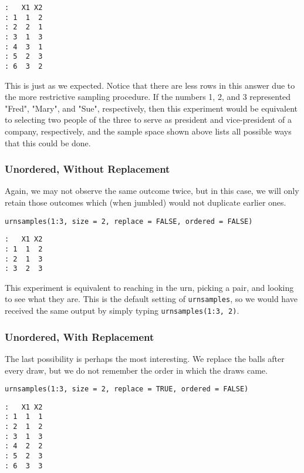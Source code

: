 \begin{verbatim}
:   X1 X2
: 1  1  2
: 2  2  1
: 3  1  3
: 4  3  1
: 5  2  3
: 6  3  2
\end{verbatim}

This is just as we expected. Notice that there are less rows in this
answer due to the more restrictive sampling procedure. If the numbers
1, 2, and 3 represented "Fred", "Mary", and "Sue", respectively,
then this experiment would be equivalent to selecting two people of
the three to serve as president and vice-president of a company,
respectively, and the sample space shown above lists all possible ways
that this could be done.

\subsubsection{Unordered, Without Replacement}
\label{sec-4-1-2-4}

Again, we may not observe the same outcome twice, but in this case, we
will only retain those outcomes which (when jumbled) would not
duplicate earlier ones.

\begin{Verbatim}
urnsamples(1:3, size = 2, replace = FALSE, ordered = FALSE) 
\end{Verbatim}

\begin{verbatim}
:   X1 X2
: 1  1  2
: 2  1  3
: 3  2  3
\end{verbatim}

This experiment is equivalent to reaching in the urn, picking a pair,
and looking to see what they are. This is the default setting of
\texttt{urnsamples}, so we would have received the same output by simply
typing \texttt{urnsamples(1:3, 2)}.

\subsubsection{Unordered, With Replacement}
\label{sec-4-1-2-5}

The last possibility is perhaps the most interesting. We replace the
balls after every draw, but we do not remember the order in which the
draws came.

\begin{Verbatim}
urnsamples(1:3, size = 2, replace = TRUE, ordered = FALSE) 
\end{Verbatim}

\begin{verbatim}
:   X1 X2
: 1  1  1
: 2  1  2
: 3  1  3
: 4  2  2
: 5  2  3
: 6  3  3
\end{verbatim}


